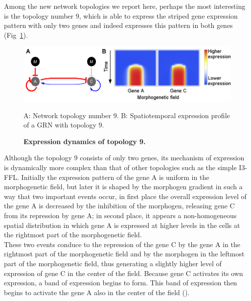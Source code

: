 \documentclass[10pt,letterpaper]{article}
\begin{document}
Among the new network topologies we report here, perhaps the most interesting
is the topology number 9, which is able to express the striped gene expression
pattern with only two genes and indeed expresses this pattern in both genes
(Fig~\ref{fig:topol9}).

\begin{figure}[!h]
 \includegraphics[width=\textwidth]{figures/results/topol-9}
 \caption{\bf Expression dynamics of topology 9.}
 A: Network topology number 9. B: Spatiotemporal expression profile of a GRN
 with topology 9.
 \label{fig:topol9}
\end{figure}

Although the topology 9 consists of only two genes, its mechanism of expression
is dynamically more complex than that of other topologies such as the simple
I3-FFL. Initially the expression pattern of the gene A is uniform in the
morphogenetic field, but later it is shaped by the morphogen gradient in such a
way that two important events occur, in first place the overall expression
level of the gene A is decreased by the inhibition of the morphogen, releasing
gene C from its repression by gene A; in second place, it appears a 
non-homogeneous spatial distribution in which gene A is expressed at higher 
levels in the cells at the rightmost part of the morphogenetic field.\\

These two events conduce to the repression of the gene C by the gene A in the
rightmost part of the morphogenetic field and by the morphogen in the leftmost
part of the morphogenetic field, thus generating a slightly higher level of
expression of gene C in the center of the field. Because gene C activates its
own expression, a band of expression begins to form. This band of expression
then begins to activate the gene A also in the center of the field
().

\end{document}

